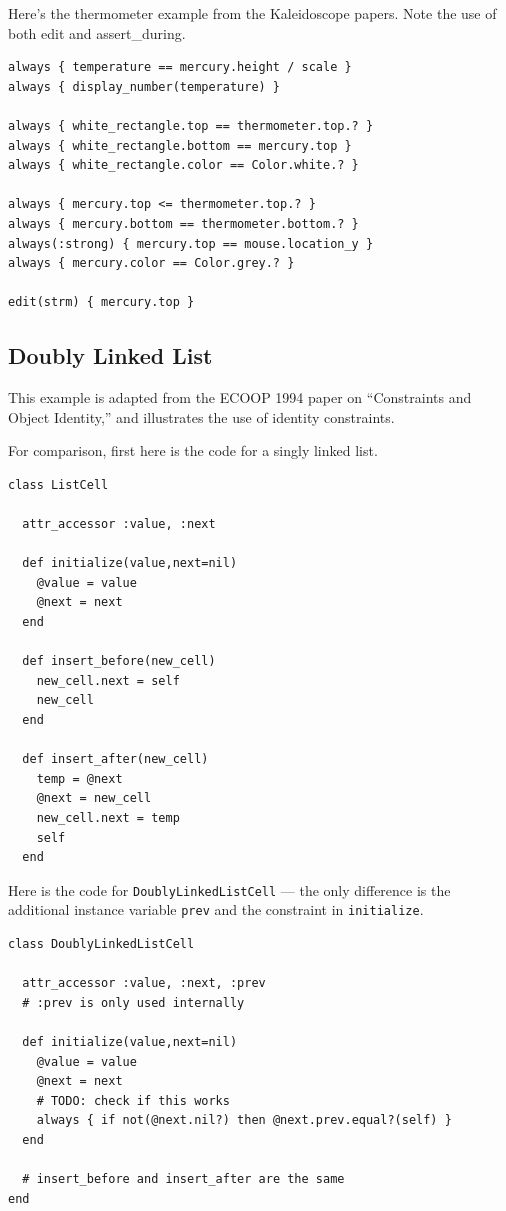 \documentclass[11pt]{article}
\begin{document}
Here's the thermometer example from the Kaleidoscope papers.  Note the
use of both edit and assert\_during.

\begin{lstlisting}
always { temperature == mercury.height / scale }
always { display_number(temperature) }

always { white_rectangle.top == thermometer.top.? }
always { white_rectangle.bottom == mercury.top }
always { white_rectangle.color == Color.white.? }

always { mercury.top <= thermometer.top.? }
always { mercury.bottom == thermometer.bottom.? }
always(:strong) { mercury.top == mouse.location_y }
always { mercury.color == Color.grey.? }

edit(strm) { mercury.top }
\end{lstlisting}

\subsection{Doubly Linked List}

This example is adapted from the ECOOP 1994 paper on ``Constraints and
Object Identity,'' and illustrates the use of identity constraints.

For comparison, first here is the code for a singly linked list.

\begin{lstlisting}
class ListCell

  attr_accessor :value, :next

  def initialize(value,next=nil)
    @value = value
    @next = next
  end

  def insert_before(new_cell)
    new_cell.next = self
    new_cell
  end

  def insert_after(new_cell)
    temp = @next
    @next = new_cell
    new_cell.next = temp
    self
  end
\end{lstlisting}

Here is the code for \lstinline{DoublyLinkedListCell} --- the only
difference is the additional instance variable \lstinline{prev} and
the constraint in \lstinline{initialize}.

\begin{lstlisting}
class DoublyLinkedListCell

  attr_accessor :value, :next, :prev 
  # :prev is only used internally

  def initialize(value,next=nil)
    @value = value
    @next = next
    # TODO: check if this works
    always { if not(@next.nil?) then @next.prev.equal?(self) }
  end

  # insert_before and insert_after are the same 
end
\end{lstlisting}
\end{document}
